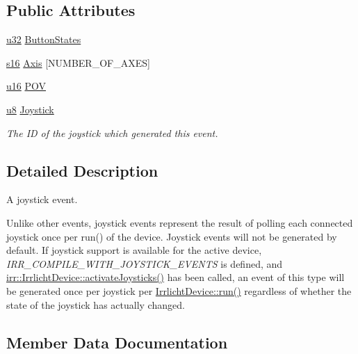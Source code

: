\subsection*{Public Attributes}
\begin{DoxyCompactItemize}
\item 
\hyperlink{namespaceirr_a0416a53257075833e7002efd0a18e804}{u32} \hyperlink{structirr_1_1SEvent_1_1SJoystickEvent_a4fd74c22d62c1613405dc3191ccc5b7c}{Button\+States}
\item 
\hyperlink{namespaceirr_a43ace0af066371ac0862bac3f7314220}{s16} \hyperlink{structirr_1_1SEvent_1_1SJoystickEvent_a1ad2615ffdd8de01b93414228ac3a2d9}{Axis} \mbox{[}N\+U\+M\+B\+E\+R\+\_\+\+O\+F\+\_\+\+A\+X\+ES\mbox{]}
\item 
\hyperlink{namespaceirr_ae9f8ec82692ad3b83c21f555bfa70bcc}{u16} \hyperlink{structirr_1_1SEvent_1_1SJoystickEvent_af30285332d154507b9752ffde3f6bf84}{P\+OV}
\item 
\hyperlink{namespaceirr_a646874f69af8ff87fc10201b0254a761}{u8} \hyperlink{structirr_1_1SEvent_1_1SJoystickEvent_a04424b44a1c3370263afb3af501cae44}{Joystick}
\begin{DoxyCompactList}\small\item\em The ID of the joystick which generated this event. \end{DoxyCompactList}\end{DoxyCompactItemize}


\subsection{Detailed Description}
A joystick event. 

Unlike other events, joystick events represent the result of polling each connected joystick once per run() of the device. Joystick events will not be generated by default. If joystick support is available for the active device, {\itshape I\+R\+R\+\_\+\+C\+O\+M\+P\+I\+L\+E\+\_\+\+W\+I\+T\+H\+\_\+\+J\+O\+Y\+S\+T\+I\+C\+K\+\_\+\+E\+V\+E\+N\+TS} is defined, and \hyperlink{classirr_1_1IrrlichtDevice_af06f8d2c4fdffd1f879e46685bcbc6e3}{irr\+::\+Irrlicht\+Device\+::activate\+Joysticks()} has been called, an event of this type will be generated once per joystick per \hyperlink{classirr_1_1IrrlichtDevice_a0489f8151dc43f6f41503ffb5a160b35}{Irrlicht\+Device\+::run()} regardless of whether the state of the joystick has actually changed. 

\subsection{Member Data Documentation}
